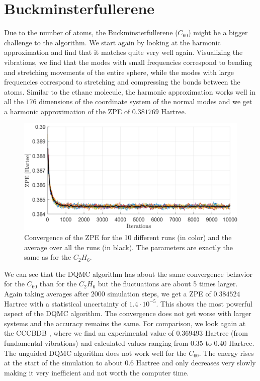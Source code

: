 \documentclass [12pt]{report}
\begin{document}
\section{Buckminsterfullerene}
Due to the number of atoms, the Buckminsterfullerene ($C_{60}$) might be a bigger challenge to the algorithm. We start again by looking at the harmonic approximation and find that it matches quite very well again. Visualizing the vibrations, we find that the modes with small frequencies correspond to bending and stretching movements of the entire sphere, while the modes with large frequencies correspond to stretching and compressing the bonds between the atoms. 
Similar to the ethane molecule, the harmonic approximation works well in all the $176$ dimensions of the coordinate system of the normal modes and we get a harmonic approximation of the ZPE of $0.381769$ Hartree.

\begin{figure}[H]
\includegraphics[width=\linewidth] {c60_1.png}
\caption{Convergence of the ZPE for the 10 different runs (in color) and the average over all the runs (in black). The parameters are exactly the same as for the $C_2H_6$.} \label{c60_1}
\end{figure}

We can see that the DQMC algorithm has about the same convergence behavior for the $C_{60}$ than for the $C_2H_6$ but the fluctuations are about 5 times larger. Again taking averages after $2000$ simulation steps, we get a ZPE of $0.384524$ Hartree with a statistical uncertainty of $1.4 \cdot 10^{-5}$. This shows the most powerful aspect of the DQMC algorithm. The convergence does not get worse with larger systems and the accuracy remains the same. For comparison, we look again at the CCCBDB \cite{cccbdb}, where we find an experimental value of  $0.369493$ Hartree (from fundamental vibrations) and calculated values ranging from 0.35 to 0.40 Hartree.\\
The unguided DQMC algorithm does not work well for the $C_{60}$. The energy rises at the start of the simulation to about 0.6 Hartree and only decreases very  slowly making it very inefficient and not worth the computer time.
\newpage
\end{document}
